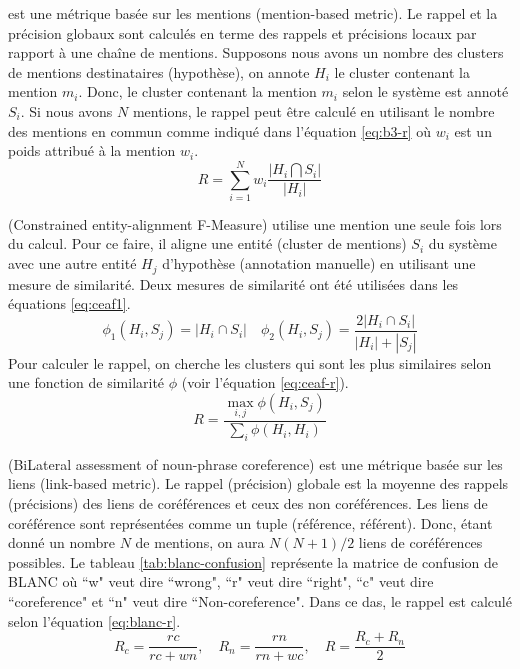 \documentclass{KodeBook}
\begin{document}
 est une métrique basée sur les mentions (mention-based metric). 
Le rappel et la précision globaux sont calculés en terme des rappels et précisions locaux par rapport à une chaîne de mentions. 
Supposons nous avons un nombre des clusters de mentions destinataires (hypothèse), on annote $H_i$ le cluster contenant la mention $m_i$. 
Donc, le cluster contenant la mention $m_i$ selon le système est annoté $S_i$. 
Si nous avons $N$ mentions, le rappel peut être calculé en utilisant le nombre des mentions en commun comme indiqué dans l'équation \ref{eq:b3-r} où $w_i$ est un poids attribué à la mention $w_i$. 
\begin{equation}\label{eq:b3-r}
R = \sum_{i=1}^{N} w_i \frac{|H_i \bigcap S_i|}{|H_i|}
\end{equation}

 (Constrained entity-alignment F-Measure) utilise une mention une seule fois lors du calcul. 
Pour ce faire, il aligne une entité (cluster de mentions) $S_i$ du système avec une autre entité $H_j$ d'hypothèse (annotation manuelle) en utilisant une mesure de similarité. 
Deux mesures de similarité ont été utilisées dans les équations \ref{eq:ceaf1}.
\begin{equation}\label{eq:ceaf1}
\phi_1(H_i, S_j) = |H_i \cap S_i | \quad \phi_2(H_i, S_j) = \frac{2|H_i \cap S_i | }{|H_i| + |S_j|}
\end{equation}
Pour calculer le rappel, on cherche les clusters qui sont les plus similaires selon une fonction de similarité $\phi$ (voir l'équation \ref{eq:ceaf-r}).
\begin{equation}\label{eq:ceaf-r}
R = \frac{\max_{i,j} \phi(H_i, S_j)}{\sum_i \phi(H_i, H_i)}
\end{equation}


 (BiLateral assessment of noun-phrase coreference) est une métrique basée sur les liens (link-based metric). 
Le rappel (précision) globale est la moyenne des rappels (précisions) des liens de coréférences et ceux des non coréférences. 
Les liens de coréférence sont représentées comme un tuple (référence, référent).
Donc, étant donné un nombre $N$ de mentions, on aura $N (N+1)/2$ liens de coréférences possibles. 
Le tableau \ref{tab:blanc-confusion} représente la matrice de confusion de BLANC où ``w" veut dire ``wrong", ``r" veut dire ``right", ``c" veut dire ``coreference" et ``n" veut dire ``Non-coreference".
Dans ce das, le rappel est calculé selon l'équation \ref{eq:blanc-r}.
\begin{equation}\label{eq:blanc-r}
R_c = \frac{rc}{rc+wn},\quad R_n = \frac{rn}{rn+wc},\quad R = \frac{R_c + R_n}{2}
\end{equation}
\end{document}
